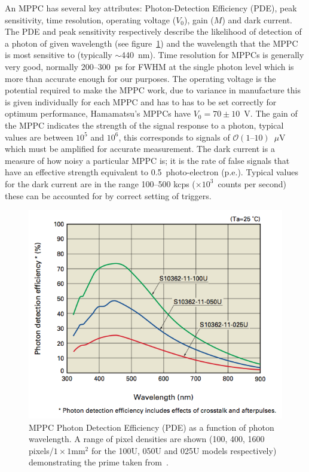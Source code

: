 An MPPC has several key attributes: Photon-Detection Efficiency (PDE), peak sensitivity, time resolution, operating voltage (\( V_0 \)), gain (\( M \)) and dark current. The PDE and peak sensitivity respectively describe the likelihood of detection of a photon of given wavelength (see figure~\ref{fig:images_intro_hamamatsu_pde_vs_wavelength}) and the wavelength that the MPPC is most sensitive to (typically \(\sim\)440~nm). Time resolution for MPPCs is generally very good, normally 200--300~ps for FWHM at the single photon level which is more than accurate enough for our purposes. The operating voltage is the potential required to make the MPPC work, due to variance in manufacture this is given individually for each MPPC and has to has to be set correctly for optimum performance, Hamamatsu's MPPCs have \( V_0 = 70\pm10 \)~V. The gain of the MPPC indicates the strength of the signal response to a photon, typical values are between \( 10^5 \) and \( 10^6 \), this corresponds to signals of \( \mathcal{O}(1\text{--}10) \)~\(\mu\)V which must be amplified for accurate measurement. The dark current is a measure of how noisy a particular MPPC is; it is the rate of false signals that have an effective strength equivalent to 0.5~photo-electron (p.e.). Typical values for the dark current are in the range 100--500 kcps (\(\times10^3\)~counts per second) these can be accounted for by correct setting of triggers.
\begin{figure}[hptb]
  \centering
    \includegraphics[width=.5\textwidth]{images/intro/hamamatsu_pde_vs_wavelength.png}
  \caption{MPPC Photon Detection Efficiency (PDE) as a function of photon wavelength. A range of pixel densities are shown (100, 400, 1600 pixels/\( 1\times1\text{mm}^2\) for the 100U, 050U and 025U models respectively) demonstrating the prime taken from~\cite{hamamatsu_mppc_tech_report}.}
  \label{fig:images_intro_hamamatsu_pde_vs_wavelength}
\end{figure}

